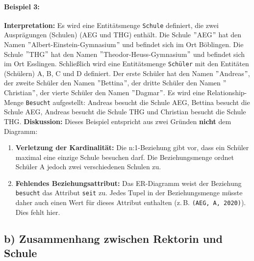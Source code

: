 \documentclass[12pt]{scrartcl}
\begin{document}
    \paragraph*{Beispiel 3:}
    \newline\textbf{Interpretation:} Es wird eine Entitätsmenge \texttt{Schule} definiert, die zwei Ausprägungen (Schulen) (AEG und THG) enthält. Die Schule \("\)AEG\("\) hat den Namen \("\)Albert-Einstein-Gymnasium\("\) und befindet sich im Ort Böblingen. Die Schule \("\)THG\("\) hat den Namen \("\)Theodor-Heuss-Gymnasium\("\) und befindet sich im Ort Esslingen. Schließlich wird eine Entitätsmenge \texttt{Schüler} mit den Entitäten (Schülern) A, B, C und D definiert. Der erste Schüler hat den Namen \("\)Andreas\("\), der zweite Schüler den Namen \("\)Bettina\("\), der dritte Schüler den Namen \("\)Christian\("\), der vierte Schüler den Namen \("\)Dagmar\("\). Es wird eine Relationship-Menge \texttt{Besucht} aufgestellt: Andreas besucht die Schule AEG, Bettina besucht die Schule AEG, Andreas besucht die Schule THG und Christian besucht die Schule THG.
    \newline\textbf{Diskussion:} Dieses Beispiel entspricht aus zwei Gründen \textbf{nicht} dem Diagramm:
    \begin{enumerate}
        \item \textbf{Verletzung der Kardinalität:} Die n:1-Beziehung gibt vor, dass ein Schüler maximal eine einzige Schule besuchen darf. Die Beziehungsmenge ordnet Schüler A jedoch zwei verschiedenen Schulen zu.
        \item \textbf{Fehlendes Beziehungsattribut:} Das ER-Diagramm weist der Beziehung \texttt{besucht} das Attribut \texttt{seit} zu. Jedes Tupel in der Beziehungsmenge müsste daher auch einen Wert für dieses Attribut enthalten (z.\,B. \texttt{(AEG, A, 2020)}). Dies fehlt hier.
    \end{enumerate}
    \newpage
    \subsection*{b) Zusammenhang zwischen Rektorin und Schule}
\end{document}
